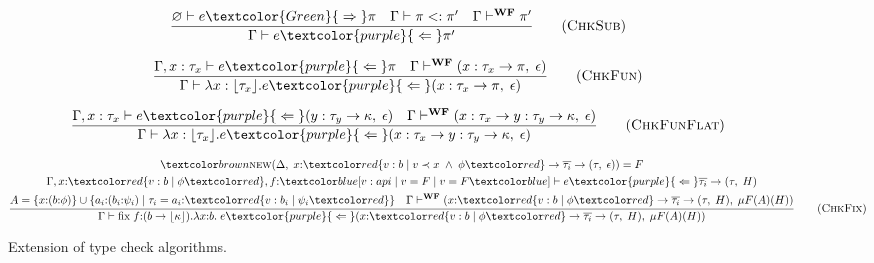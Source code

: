 \begin{figure}[ht]
    \begin{multicols}{2}
        \begin{equation}
            \frac{
                \varnothing \vdash e \textcolor{Green}{\;\Rightarrow\;} \pi \quad \Gamma \vdash \pi <: \pi' \quad \Gamma \vdash^{\textbf{WF}} \pi'
            }{
                \Gamma \vdash e \textcolor{purple}{\;\Leftarrow\;} \pi'
            }
            \tag{\textsc{ChkSub}}
            \label{eq:chksub}
        \end{equation}

        \columnbreak
    
        \begin{equation}
            \frac{
                \Gamma, x: \tau_x \vdash e \textcolor{purple}{\;\Leftarrow\;} \pi \quad \Gamma \vdash^{\textbf{WF}} (x: \tau_x \rightarrow \pi, \; \epsilon)
            }{
                \Gamma \vdash \lambda x : \lfloor\tau_x\rfloor. e \textcolor{purple}{\;\Leftarrow\;} (x: \tau_x \rightarrow \pi, \; \epsilon)
            }
            \tag{\textsc{ChkFun}}
            \label{eq:chkfun}
        \end{equation}
    \end{multicols}
    
    \begin{equation}
        \frac{
            \Gamma, x: \tau_x \vdash e \textcolor{purple}{\;\Leftarrow\;} (y: \tau_y \rightarrow \kappa, \; \epsilon) \quad \Gamma \vdash^{\textbf{WF}} (x: \tau_x \rightarrow y: \tau_y \rightarrow \kappa, \; \epsilon)
        }{
            \Gamma \vdash \lambda x : \lfloor\tau_x\rfloor. e \textcolor{purple}{\;\Leftarrow\;} (x: \tau_x \rightarrow y: \tau_y \rightarrow \kappa, \; \epsilon)
        }
        \tag{\textsc{ChkFunFlat}}
        \label{eq:chkflat}
    \end{equation}

    \begin{equation}
        \frac{
            \begin{gathered}
                \nextd(\Delta, \;x{:}\overa{v: b \;|\; v \prec x \;\land\; \phi} \rightarrow \overline{\tau_i} \rightarrow (\tau, \;\epsilon)) = F \\
                \Gamma, x{:}\overa{v: b \;|\; \phi}, f{:}\under{v: api \;|\; v = F \;|\; v = F} \vdash e \textcolor{purple}{\;\Leftarrow\;} \overline{\tau_i} \rightarrow (\tau, \;H) \\
                A = \{x{:}(b{:}\phi)\} \cup \{a_i{:}(b_i{:}\psi_i) \;|\; \tau_i = a_i{:}\overa{v: b_i \;|\; \psi_i}\} \quad \Gamma \vdash^{\textbf{WF}} (x{:}\overa{v: b \;|\; \phi} \rightarrow \overline{\tau_i} \rightarrow (\tau, \;H), \;\mu F(A)(H))
            \end{gathered}
        }{
            \Gamma \vdash \text{fix}\;f{:}(b \rightarrow \lfloor\kappa\rfloor).\lambda x{:}b.\;e \textcolor{purple}{\;\Leftarrow\;} (x{:}\overa{v: b \;|\; \phi} \rightarrow \overline{\tau_i} \rightarrow (\tau, \;H), \;\mu F(A)(H))
        }
        \tag{\textsc{ChkFix}}
        \label{eq:chkfix}
    \end{equation}
    \caption{Extension of type check algorithms.}
    \label{fig:type-check}
\end{figure}

